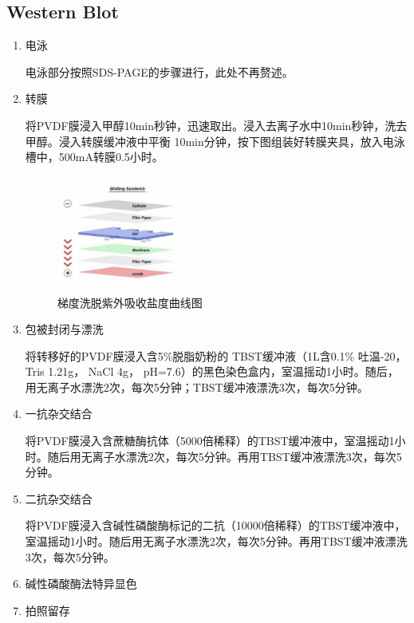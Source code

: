 \subsection{Western Blot}
\begin{enumerate}
    \item 电泳
    
\hspace*{2em} 电泳部分按照SDS-PAGE的步骤进行，此处不再赘述。

    \item 转膜

\hspace*{2em} 将PVDF膜浸入甲醇10min秒钟，迅速取出。浸入去离子水中10min秒钟，洗去甲醇。浸入转膜缓冲液中平衡 10min分钟，按下图组装好转膜夹具，放入电泳槽中，500mA转膜0.5小时。

\begin{figure}[H]
    \centering
    \includegraphics[width = 0.4\textwidth]{figure/Some Pictures/Blot Sandwich.png}
    \caption{梯度洗脱紫外吸收盐度曲线图}
    \label{fig:instrument}
\end{figure}

    \item 包被封闭与漂洗

\hspace*{2em} 将转移好的PVDF膜浸入含5\%脱脂奶粉的 TBST缓冲液（1L含0.1\% 吐温-20，Tris 1.21g， NaCl 4g， pH=7.6）的黑色染色盒内，室温摇动1小时。随后，用无离子水漂洗2次，每次5分钟；TBST缓冲液漂洗3次，每次5分钟。

    \item 一抗杂交结合
    
\hspace*{2em} 将PVDF膜浸入含蔗糖酶抗体（5000倍稀释）的TBST缓冲液中，室温摇动1小时。随后用无离子水漂洗2次，每次5分钟。再用TBST缓冲液漂洗3次，每次5分钟。

    \item 二抗杂交结合
    
\hspace*{2em} 将PVDF膜浸入含碱性磷酸酶标记的二抗（10000倍稀释）的TBST缓冲液中，室温摇动1小时。随后用无离子水漂洗2次，每次5分钟。再用TBST缓冲液漂洗3次，每次5分钟。
    \item 碱性磷酸酶法特异显色
    \item 拍照留存
    
\end{enumerate}

